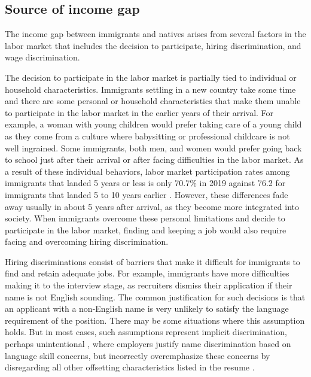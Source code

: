 \subsection{Source of income gap}

The income gap between immigrants and natives arises from several factors in the labor market that includes the decision to participate, hiring discrimination, and wage discrimination.

\vspace{0.7em}\par
The decision to participate in the labor market is partially tied to individual or household characteristics.
Immigrants settling in a new country take some time and there are some personal or household characteristics that make them unable to participate in the labor market in the earlier years of their arrival.
For example, a woman with young children would prefer taking care of a young child as they come from a culture where babysitting or professional childcare is not well ingrained.
Some immigrants, both men, and women would prefer going back to school just after their arrival or after facing difficulties in the labor market.
As a result of these individual behaviors, labor market participation rates among immigrants that landed 5 years or less is only 70.7\% in 2019 against 76.2 for immigrants that landed 5 to 10 years earlier \citep{statCan:002}.
However, these differences fade away usually in about 5 years after arrival, as they become more integrated into society.
When immigrants overcome these personal limitations and decide to participate in the labor market, finding and keeping a job would also require facing and overcoming hiring discrimination.

\vspace{0.7em}\par
Hiring discriminations consist of barriers that make it difficult for immigrants to find and retain adequate jobs.
For example, immigrants have more difficulties making it to the interview stage, as recruiters dismiss their application if their name is not English sounding.
The common justification for such decisions is that an applicant with a non-English name is very unlikely to satisfy the language requirement of the position.
There may be some situations where this assumption holds.
But in most cases, such assumptions represent implicit discrimination, perhaps unintentional \citep{Crandall:wo,ROOTH2010523}, where employers justify name discrimination based on language skill concerns, but incorrectly overemphasize these concerns by disregarding all other offsetting characteristics listed in the resume \citep{Oreopoulos:2011jv}.

